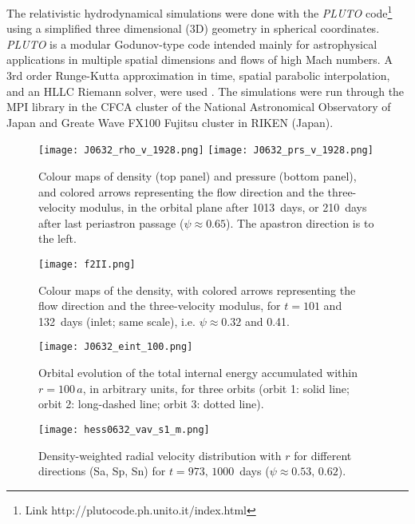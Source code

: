 \documentclass[usenatbib]{mn2e}
\begin{document}
The relativistic hydrodynamical simulations were done with the {\it PLUTO} code\footnote{Link http://plutocode.ph.unito.it/index.html} 
\citep{mbm07} using a simplified three dimensional (3D) geometry in spherical coordinates. {\it PLUTO} is a modular 
Godunov-type code intended mainly for astrophysical applications in multiple spatial dimensions and flows 
of high Mach numbers. A 3rd order Runge-Kutta approximation in time, spatial parabolic interpolation, and an HLLC Riemann solver, 
were used \citep{mig05}. The simulations were run through the MPI library in the CFCA cluster of the National Astronomical Observatory 
of Japan and Greate Wave FX100 Fujitsu cluster in RIKEN (Japan).

\begin{figure}
\texttt{[image: J0632\_rho\_v\_1928.png]}
\texttt{[image: J0632\_prs\_v\_1928.png]}
\vspace{-0.25cm}
\caption{Colour maps of density (top panel) and pressure (bottom panel), and colored arrows 
representing the flow direction and the three-velocity modulus, in the orbital plane after 1013~days, or 210~days after last periastron passage ($\psi\approx 0.65$). The apastron direction  is to the left.}
\label{fig:rhopm}
\end{figure}

\begin{figure}
\texttt{[image: f2II.png]}
\vspace{-0.5cm}
\caption{Colour maps of the density, with colored arrows representing the flow direction and the three-velocity modulus, for $t=101$ and 132~days (inlet; same scale), i.e. $\psi\approx 0.32$ and 0.41.}
\label{fig:rho_v_zoom}
\end{figure}

\begin{figure}
\texttt{[image: J0632\_eint\_100.png]}
\vspace{-0.25cm}
\caption{Orbital evolution of the total internal energy accumulated within $r=100\,a$, in arbitrary units, for three orbits (orbit 1: solid line; orbit 2:  long-dashed line; orbit 3: dotted line).}
\label{fig:vav_E}
\end{figure}

\begin{figure}
\texttt{[image: hess0632\_vav\_s1\_m.png]}
\vspace{-0.25cm}
\caption{Density-weighted radial velocity distribution with $r$ for different directions (Sa, Sp, Sn) for $t=973,\,1000$~days ($\psi\approx 0.53,\,0.62$).}
\label{fig:vav_r}
\end{figure}
\end{document}
